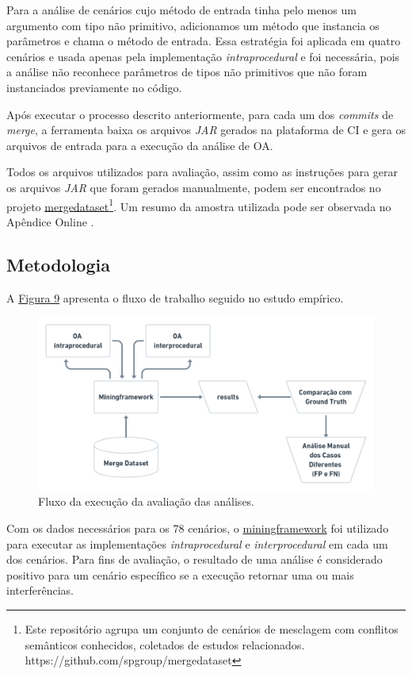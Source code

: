 Para a análise de cenários cujo método de entrada tinha pelo menos um argumento com tipo não primitivo, adicionamos um método que instancia os parâmetros e chama o método de entrada. Essa estratégia foi aplicada em quatro cenários e usada apenas pela implementação \emph{intraprocedural} e foi necessária, pois a análise não reconhece parâmetros de tipos não primitivos que não foram instanciados previamente no código. 

Após executar o processo descrito anteriormente, para cada um dos \emph{commits} de \emph{merge}, a ferramenta baixa os arquivos \emph{JAR} gerados na plataforma de CI e gera os arquivos de entrada para a execução da análise de OA.

Todos os arquivos utilizados para avaliação, assim como as instruções para gerar os arquivos \emph{JAR} que foram gerados manualmente, podem ser encontrados no projeto \href{https://github.com/spgroup/mergedataset}{mergedataset}\footnote{Este repositório agrupa um conjunto de cenários de mesclagem com conflitos semânticos conhecidos, coletados de estudos relacionados. https://github.com/spgroup/mergedataset}. Um resumo da amostra utilizada pode ser observada no Apêndice Online .

\subsection{Metodologia}
\label{sec:metodologia}

A \hyperref[fig:fluxo-execucao]{Figura 9} apresenta o fluxo de trabalho seguido no estudo empírico.

\begin{figure}[!h]
    \centering
    \includegraphics[width=0.8\linewidth]{images/FluxodaAvaliacao.png}
    \caption{Fluxo da execução da avaliação das análises.}
    \label{fig:fluxo-execucao}
\end{figure}


Com os dados necessários para os 78 cenários, o \href{https://github.com/spgroup/miningframework}{miningframework} foi utilizado para executar as implementações  \emph{intraprocedural} e  \emph{interprocedural} em cada um dos cenários. Para fins de avaliação, o resultado de uma análise é considerado positivo para um cenário específico se a execução retornar uma ou mais interferências.

